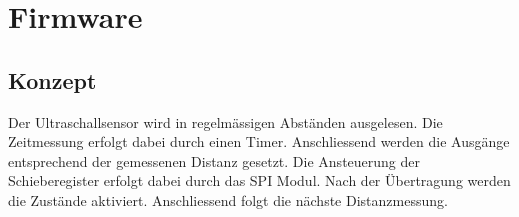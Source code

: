 



\section{Firmware}

\subsection{Konzept}
Der Ultraschallsensor wird in regelmässigen Abständen ausgelesen. Die 
Zeitmessung erfolgt dabei durch einen Timer. Anschliessend werden die 
Ausgänge entsprechend der gemessenen Distanz gesetzt. Die Ansteuerung der 
Schieberegister erfolgt dabei durch das SPI Modul. Nach der Übertragung 
werden die Zustände aktiviert. Anschliessend folgt die nächste 
Distanzmessung. 
